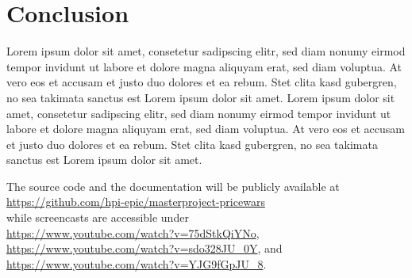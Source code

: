 \newpage 
\section{Conclusion}
\label{sec:conclusion}

Lorem ipsum dolor sit amet, consetetur sadipscing elitr, sed diam nonumy eirmod tempor invidunt ut labore et dolore magna aliquyam erat, sed diam voluptua. At vero eos et accusam et justo duo dolores et ea rebum. Stet clita kasd gubergren, no sea takimata sanctus est Lorem ipsum dolor sit amet. Lorem ipsum dolor sit amet, consetetur sadipscing elitr, sed diam nonumy eirmod tempor invidunt ut labore et dolore magna aliquyam erat, sed diam voluptua. At vero eos et accusam et justo duo dolores et ea rebum. Stet clita kasd gubergren, no sea takimata sanctus est Lorem ipsum dolor sit amet.

The source code and the documentation will be publicly available at\\
\url{https://github.com/hpi-epic/masterproject-pricewars} \\
while screencasts are accessible under\\
\sloppy
\url{https://www.youtube.com/watch?v=75dStkQiYNo},  
\url{https://www.youtube.com/watch?v=sdo328JU_0Y}, and
\url{https://www.youtube.com/watch?v=YJG9fGpJU_8}.\\